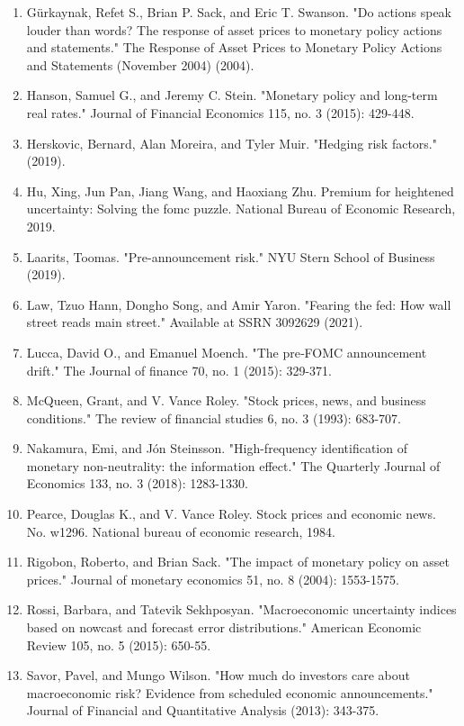 \documentclass[12pt]{article}
\begin{document}
\begin{enumerate}
    \item{Gürkaynak, Refet S., Brian P. Sack, and Eric T. Swanson. "Do actions speak louder than words? The response of asset prices to monetary policy actions and statements." The Response of Asset Prices to Monetary Policy Actions and Statements (November 2004) (2004).}
    \item{Hanson, Samuel G., and Jeremy C. Stein. "Monetary policy and long-term real rates." Journal of Financial Economics 115, no. 3 (2015): 429-448.}
    \item{Herskovic, Bernard, Alan Moreira, and Tyler Muir. "Hedging risk factors." (2019).}
    \item{Hu, Xing, Jun Pan, Jiang Wang, and Haoxiang Zhu. Premium for heightened uncertainty: Solving the fomc puzzle. National Bureau of Economic Research, 2019.}
    \item{Laarits, Toomas. "Pre-announcement risk." NYU Stern School of Business (2019).}
    \item{Law, Tzuo Hann, Dongho Song, and Amir Yaron. "Fearing the fed: How wall street reads main street." Available at SSRN 3092629 (2021).}
    \item{Lucca, David O., and Emanuel Moench. "The pre‐FOMC announcement drift." The Journal of finance 70, no. 1 (2015): 329-371.}
    \item{McQueen, Grant, and V. Vance Roley. "Stock prices, news, and business conditions." The review of financial studies 6, no. 3 (1993): 683-707.}
    \item{Nakamura, Emi, and Jón Steinsson. "High-frequency identification of monetary non-neutrality: the information effect." The Quarterly Journal of Economics 133, no. 3 (2018): 1283-1330.}
    \item{Pearce, Douglas K., and V. Vance Roley. Stock prices and economic news. No. w1296. National bureau of economic research, 1984.}
    \item{Rigobon, Roberto, and Brian Sack. "The impact of monetary policy on asset prices." Journal of monetary economics 51, no. 8 (2004): 1553-1575.}
    \item{Rossi, Barbara, and Tatevik Sekhposyan. "Macroeconomic uncertainty indices based on nowcast and forecast error distributions." American Economic Review 105, no. 5 (2015): 650-55.}
    \item{Savor, Pavel, and Mungo Wilson. "How much do investors care about macroeconomic risk? Evidence from scheduled economic announcements." Journal of Financial and Quantitative Analysis (2013): 343-375.}

\end{enumerate}
\end{document}
